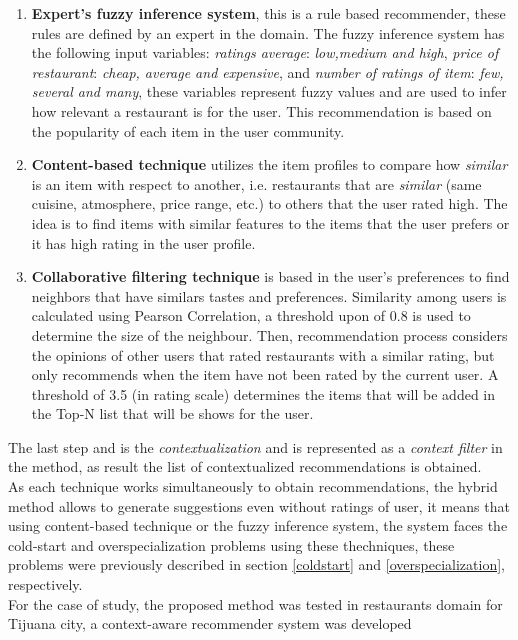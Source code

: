 \begin{enumerate} 
\item \textbf{Expert's fuzzy inference system}, 
this is a rule based recommender, these rules are defined by 
an expert in the domain. The
fuzzy inference system has the following input variables:
\textit{ratings average}:  \textit{low,medium and high}, \textit{price
of restaurant}:  \textit{cheap, average and expensive}, and
\textit{number of ratings of item}:  \textit{few, several and many},
these variables represent fuzzy values and are used to infer how
relevant a restaurant is for the  user. This recommendation is based
on the popularity of each  item in the user community. 
\item \textbf{Content-based technique} 
utilizes the item profiles  to compare how
\textit{similar} is an item with respect to  another, i.e. restaurants
that are \textit{similar} (same cuisine,  atmosphere, price range,
etc.) to others that the user rated high.  The idea is to find items
with similar features to the items that the  user prefers or it has
high rating in the user profile. 
\item \textbf{Collaborative filtering technique} 
is based in the user's preferences  to find neighbors that
have similars tastes and preferences. Similarity among users is
calculated using Pearson Correlation, a threshold upon of 0.8 is used
to determine the size of the neighbour. Then, recommendation process
considers the opinions of other users that rated restaurants with a
similar rating, but only recommends when the item have not been rated
by the current user. A threshold of 3.5 (in rating scale) determines
the items that will be added in the Top-N list that will be shows for
the user. 
\end{enumerate}  
The last step and is the \textit{contextualization} and is
represented as a \textit{context filter} in the method, as result the
list of contextualized recommendations is obtained. \\ As each
technique works simultaneously to obtain recommendations, the hybrid
method allows to generate suggestions even without  ratings of user,
it means that using content-based technique or the fuzzy inference system, 
the system faces the cold-start and overspecialization
problems using these thechniques, these problems were previously
described in section \ref{coldstart} and \ref{overspecialization},
respectively.\\ 
For the case of study, the proposed method was tested in restaurants
domain for Tijuana city, a context-aware recommender system was developed 

